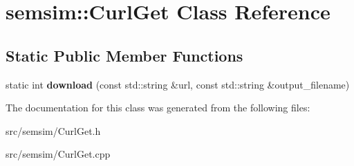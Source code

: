 \hypertarget{classsemsim_1_1CurlGet}{}\section{semsim\+:\+:Curl\+Get Class Reference}
\label{classsemsim_1_1CurlGet}
\subsection*{Static Public Member Functions}
\begin{DoxyCompactItemize}
\item 
\mbox{\label{classsemsim_1_1CurlGet_ab84cbd76261ce3b191a9442a539fd430}} 
static int {\bfseries download} (const std\+::string \&url, const std\+::string \&output\+\_\+filename)
\end{DoxyCompactItemize}


The documentation for this class was generated from the following files\+:\begin{DoxyCompactItemize}
\item 
src/semsim/Curl\+Get.\+h\item 
src/semsim/Curl\+Get.\+cpp\end{DoxyCompactItemize}
